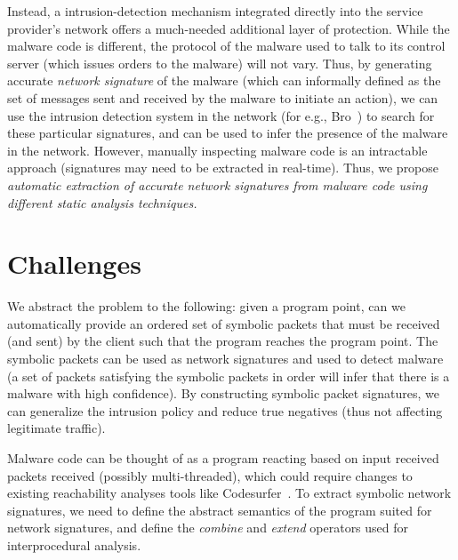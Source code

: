 \documentclass[twocolumn, 11pt]{paper}
\begin{document}
Instead, a intrusion-detection mechanism integrated 
directly into the service provider’s network offers a
much-needed additional layer of protection. While the malware
code is different, the protocol of the malware used to talk to its
control server (which issues orders to the malware) will not vary. 
Thus, by generating accurate \emph{network signature} of the malware (which
can informally defined as the set of messages sent and received by the malware to
initiate an action), we can use the intrusion detection system in the
network (for e.g., Bro~\cite{bro}) to search for these particular signatures,
and can be used to infer the presence of the malware in the network. However,
manually inspecting malware code is an intractable approach (signatures may 
need to be extracted in real-time). Thus, we propose \emph{automatic extraction 
of accurate network signatures from malware code using different static
analysis techniques.} 

\section{Challenges}
We abstract the problem to the following: given a program point,
can we automatically provide an ordered set of symbolic packets 
that must be received (and sent) by the client such that the program 
reaches the program point. The symbolic packets can be used as
network signatures and used to detect malware (a set of packets
satisfying the symbolic packets in order will infer that there 
is a malware with high confidence). By constructing symbolic packet
signatures, we can generalize the intrusion policy and reduce 
true negatives (thus not affecting legitimate traffic).

Malware code can be thought of as a program reacting based on input received
packets received (possibly multi-threaded), which
could require changes to existing reachability analyses tools 
like Codesurfer~\cite{codesurfer}. To extract symbolic network
signatures, we need to define the abstract semantics of the program
suited for network signatures, and define the \emph{combine} and 
\emph{extend} operators used for interprocedural analysis.
\end{document}
